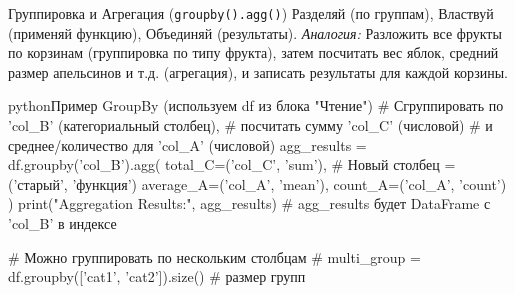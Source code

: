 \begin{myblock}{{Группировка и Агрегация (\texttt{groupby().agg()})}}
    Разделяй (по группам), Властвуй (применяй функцию), Объединяй (результаты).
    \textit{Аналогия:} Разложить все фрукты по корзинам (группировка по типу фрукта), затем посчитать вес яблок, средний размер апельсинов и т.д. (агрегация), и записать результаты для каждой корзины.
    \begin{codebox}{python}{Пример GroupBy (используем df из блока "Чтение")}
    # Сгруппировать по 'col_B' (категориальный столбец),
    # посчитать сумму 'col_C' (числовой)
    # и среднее/количество для 'col_A' (числовой)
    agg_results = df.groupby('col_B').agg(
        total_C=('col_C', 'sum'),       # Новый столбец = ('старый', 'функция')
        average_A=('col_A', 'mean'),
        count_A=('col_A', 'count')
    )
    print("Aggregation Results:\n", agg_results)
    # agg_results будет DataFrame с 'col_B' в индексе

    # Можно группировать по нескольким столбцам
    # multi_group = df.groupby(['cat1', 'cat2']).size() # размер групп
    \end{codebox}
\end{myblock}


